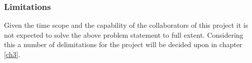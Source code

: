 \subsubsection{Limitations}
Given the time scope and the capability of the collaborators of this project it is not expected to solve the above problem statement to full extent. Considering this a number of delimitations for the project will be decided upon in chapter \ref{ch3}.
%
